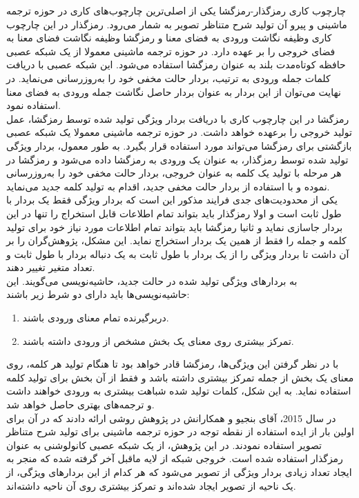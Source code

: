 چارچوب کاری رمزگذار-رمزگشا یکی از اصلی‌ترین چارچوب‌های کاری در حوزه ترجمه ماشینی و پیرو آن تولید شرح متناظر تصویر به شمار می‌رود. رمزگذار در این چارچوب کاری وظیفه نگاشت ورودی به فضای معنا و رمزگشا وظیفه نگاشت فضای معنا به فضای خروجی را بر عهده دارد. در حوزه ترجمه ماشینی معمولا از یک شبکه عصبی حافظه کوتاه‌مدت بلند به عنوان رمزگشا استفاده می‌شود. این شبکه عصبی با دریافت کلمات جمله ورودی به ترتیب، بردار حالت مخفی خود را به‌روز‌رسانی می‌نماید. در نهایت می‌توان از این بردار به عنوان بردار حاصل نگاشت جمله ورودی به فضای معنا استفاده نمود.
\\
رمزگشا در این چارچوب کاری با دریافت بردار ویژگی تولید شده توسط رمزگشا، عمل تولید خروجی را برعهده خواهد داشت. در حوزه ترجمه ماشینی معمولا یک شبکه عصبی بازگشتی برای رمزگشا می‌تواند مورد استفاده قرار بگیرد. به طور معمول، بردار ویژگی تولید شده توسط رمزگذار، به عنوان یک ورودی به رمزگشا داده می‌شود و رمزگشا در هر مرحله با تولید یک کلمه به عنوان خروجی، بردار حالت مخفی خود را به‌روزرسانی نموده و با استفاده از بردار حالت مخفی جدید، اقدام به تولید کلمه جدید می‌نماید.
\\
یکی از محدودیت‌های جدی فرایند مذکور این است که بردار ویژگی فقط یک بردار با طول ثابت است و اولا رمزگذار باید بتواند تمام اطلاعات قابل استخراج را تنها در این بردار جاسازی نماید و ثانیا رمزگشا باید بتواند تمام اطلاعات مورد نیاز خود برای تولید کلمه و جمله را فقط از همین یک بردار استخراج نماید. این مشکل، پژوهش‌گران را بر آن داشت تا بردار ویژگی را از یک بردار با طول ثابت به یک دنباله بردار با طول ثابت و تعداد متغیر تغییر دهند. 
\\
به بردارهای ویژگی تولید شده در حالت جدید، حاشیه‌نویسی می‌گویند. این حاشیه‌نویسی‌ها باید دارای دو شرط زیر باشند:
\begin{enumerate}
	\item دربرگیرنده تمام معنای ورودی باشند.
	\item تمرکز بیشتری روی معنای یک بخش مشخص از ورودی داشته باشند.
\end{enumerate}
با در نظر گرفتن این ویژگی‌ها، رمزگشا قادر خواهد بود تا هنگام تولید هر کلمه، روی معنای یک بخش از جمله تمرکز بیشتری داشته باشد و فقط از آن بخش برای تولید کلمه استفاده نماید. به این شکل، کلمات تولید شده شباهت بیشتری به ورودی خواهند داشت و ترجمه‌های بهتری حاصل خواهد شد. 
\\
در سال 2015، آقای بنجیو و همکارانش در پژوهش \cite{xu2015show} روشی ارائه دادند که در آن برای اولین بار از ایده استفاده از نقطه توجه در حوزه ترجمه ماشینی برای تولید شرح متناظر تصویر استفاده نمودند. در این پژوهش، از یک شبکه عصبی کانولوشنی به عنوان رمزگذار استفاده شده است. خروجی شبکه از لایه ماقبل آخر گرفته شده که منجر به ایجاد تعداد زیادی بردار ویژگی از تصویر می‌شود که هر کدام از این بردارهای ویژگی، از یک ناحیه از تصویر ایجاد شده‌اند و تمرکز بیشتری روی آن ناحیه داشته‌اند. 
